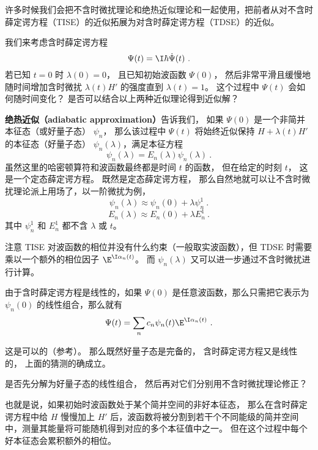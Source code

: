 

许多时候我们会把不含时微扰理论和绝热近似理论和一起使用，把前者从对不含时薛定谔方程（TISE）的近似拓展为对含时薛定谔方程（TDSE）的近似。

我们来考虑含时薛定谔方程
\begin{equation}
[H_0 + \lambda(t)H']\Psi(t) = \I\hbar\dot \Psi(t)~.
\end{equation}
若已知 $t=0$ 时 $\lambda(0) = 0$， 且已知初始波函数 $\Psi(0)$， 然后非常平滑且缓慢地随时间增加含时微扰 $\lambda(t) H'$ 的强度直到 $\lambda(t)=1$。 这个过程中 $\Psi(t)$ 会如何随时间变化？ 是否可以结合以上两种近似理论得到近似解？

\textbf{绝热近似（adiabatic approximation）}告诉我们， 如果 $\Psi(0)$ 是一个非简并本征态（或好量子态） $\psi_n$， 那么该过程中 $\Psi(t)$ 将始终近似保持 $H+\lambda(t) H'$ 的本征态（好量子态） $\psi_n(\lambda)$，满足本征方程
\begin{equation}
[H_0 + \lambda H']\psi_n(\lambda) = E_n(\lambda)\psi_n(\lambda)~.
\end{equation}
虽然这里的哈密顿算符和波函数最终都是时间 $t$ 的函数， 但在给定的时刻 $t$， 这是一个定态薛定谔方程。 既然是定态薛定谔方程， 那么自然地就可以让不含时微扰理论派上用场了，以一阶微扰为例，
\begin{equation}
\psi_n(\lambda) \approx \psi_n(0) + \lambda\psi_n^1~.
\end{equation}
\begin{equation}
E_n(\lambda) \approx E_n(0) + \lambda E_n^1~.
\end{equation}
其中 $\psi_n^1$ 和 $E_n^1$ 都不含 $\lambda$ 或 $t$。

注意 TISE 对波函数的相位并没有什么约束（一般取实波函数），但 TDSE 时需要乘以一个额外的相位因子 $\E^{\I\alpha_n(t)}$。 而 $\psi_n(\lambda)$ 又可以进一步通过不含时微扰进行计算。

由于含时薛定谔方程是线性的，如果 $\Psi(0)$ 是任意波函数，那么只需把它表示为 $\psi_n(0)$ 的线性组合，那么就有
\begin{equation}
\Psi(t) = \sum_n c_n \psi_n(t) \E^{\I\alpha_n(t)}~.
\end{equation}


这是可以的（参考\cite{GriffQ}）。 那么既然好量子态是完备的， 含时薛定谔方程又是线性的， 上面的猜测的确成立。

是否先分解为好量子态的线性组合， 然后再对它们分别用不含时微扰理论修正？

也就是说，如果初始时波函数处于某个简并空间的非好本征态， 那么在含时薛定谔方程中给 $H$ 慢慢加上 $H'$ 后，波函数将被分割到若干个不同能级的简并空间中，测量其能量将可能随机得到对应的多个本征值中之一。 但在这个过程中每个好本征态会累积额外的相位。
